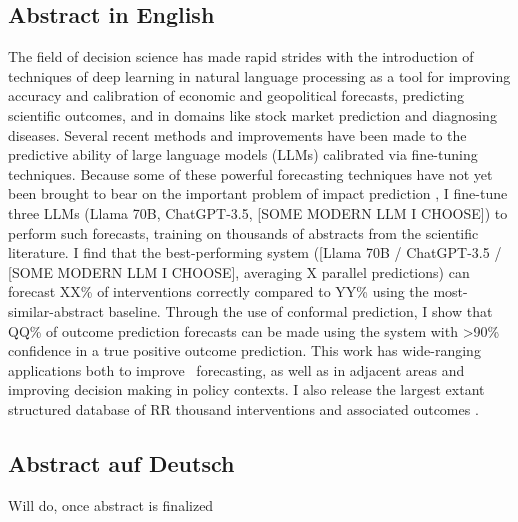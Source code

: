 \documentclass[12pt,a4paper]{article}
\begin{document}
\subsection*{Abstract in English}
The field of decision science has made rapid strides with the introduction of techniques of deep learning in natural language processing as a tool for improving accuracy and calibration of economic and geopolitical forecasts, predicting scientific outcomes, and in domains like stock market prediction and diagnosing diseases. Several recent methods and improvements have been made to the predictive ability of large language models (LLMs) calibrated via fine-tuning techniques. Because some of these powerful forecasting techniques have not yet been brought to bear on the important problem of impact prediction \ABSTRACT, I fine-tune three LLMs (Llama 70B, ChatGPT-3.5, [SOME MODERN LLM I CHOOSE]) %
to perform such forecasts, training on thousands of abstracts from the scientific literature. I find that the best-performing system ([Llama 70B / ChatGPT-3.5 / [SOME MODERN LLM I CHOOSE], averaging X %
parallel predictions) can forecast XX\% %
of interventions correctly compared to YY\% %
using the most-similar-abstract baseline.
Through the use of conformal prediction, I show that QQ\% %
of outcome prediction forecasts can be made using the system with >90\% confidence in a true positive outcome prediction. This work has wide-ranging applications both to improve \DOMAIN\ forecasting, as well as in adjacent areas and improving decision making in policy contexts. I also release the largest extant structured database of RR thousand %
interventions and associated outcomes \ABSTRACT. 


\subsection*{Abstract auf Deutsch}
Will do, once abstract is finalized %
\clearpage

\setcounter{page}{1}
\tableofcontents
\clearpage

\setcounter{page}{1}
\end{document}
